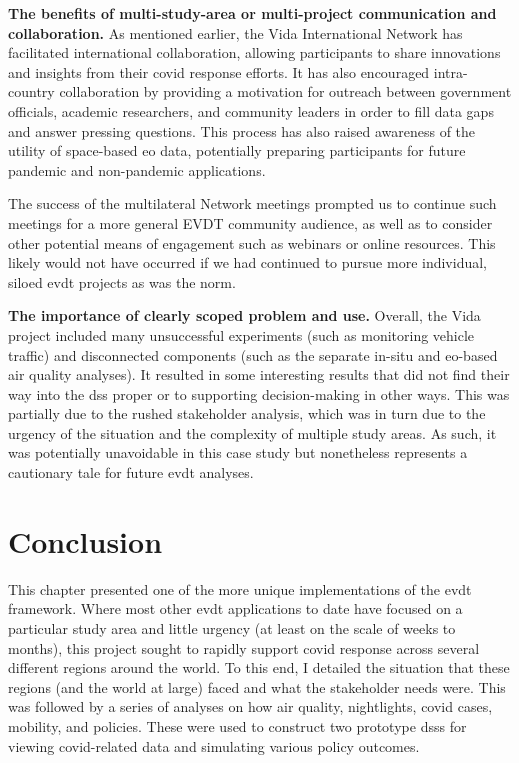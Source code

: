 \textbf{The benefits of multi-study-area or multi-project communication and collaboration.} As mentioned earlier, the Vida International Network has facilitated international collaboration, allowing participants to share innovations and insights from their \ac{covid} response efforts. It has also encouraged intra-country collaboration by providing a motivation for outreach between government officials, academic researchers, and community leaders in order to fill data gaps and answer pressing questions. This process has also raised awareness of the utility of space-based \ac{eo} data, potentially preparing participants for future pandemic and non-pandemic applications. 

The success of the multilateral Network meetings prompted us to continue such meetings for a more general EVDT community audience, as well as to consider other potential means of engagement such as webinars or online resources. This likely would not have occurred if we had continued to pursue more individual, siloed \ac{evdt} projects as was the norm.

\textbf{The importance of clearly scoped problem and use.} Overall, the Vida project included many unsuccessful experiments (such as monitoring vehicle traffic) and disconnected components (such as the separate in-situ and \ac{eo}-based air quality analyses). It resulted in some interesting results that did not find their way into the \ac{dss} proper or to supporting decision-making in other ways. This was partially due to the rushed stakeholder analysis, which was in turn due to the urgency of the situation and the complexity of multiple study areas. As such, it was potentially unavoidable in this case study but nonetheless represents a cautionary tale for future \ac{evdt} analyses.


\section{Conclusion} \label{sec:vida-concl}

This chapter presented one of the more unique implementations of the \ac{evdt} framework. Where most other \ac{evdt} applications to date have focused on a particular study area and little urgency (at least on the scale of weeks to months), this project sought to rapidly support \ac{covid} response across several different regions around the world. To this end, I detailed the situation that these regions (and the world at large) faced and what the stakeholder needs were. This was followed by a series of analyses on how air quality, nightlights, \ac{covid} cases, mobility, and policies. These were used to construct two prototype \acp{dss} for viewing \ac{covid}-related data and simulating various policy outcomes.

